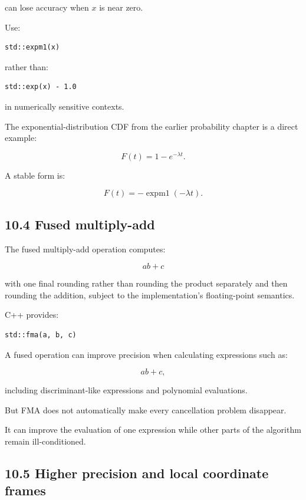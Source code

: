 can lose accuracy when \(x\) is near zero.

Use:

\begin{verbatim}
std::expm1(x)
\end{verbatim}

rather than:

\begin{verbatim}
std::exp(x) - 1.0
\end{verbatim}

in numerically sensitive contexts.

The exponential-distribution CDF from the earlier probability chapter is a direct example:

\[ F(t)=1-e^{-\lambda t}. \]

A stable form is:

\[ \boxed{ F(t)=-\operatorname{expm1}(-\lambda t) }. \]

\subsection{10.4 Fused multiply-add}\label{02-foundations-ii-ch028-fused-multiply-add}

The fused multiply-add operation computes:

\[ ab+c \]

with one final rounding rather than rounding the product separately and then rounding the addition, subject to the implementation's floating-point semantics.

C++ provides:

\begin{verbatim}
std::fma(a, b, c)
\end{verbatim}

A fused operation can improve precision when calculating expressions such as:

\[ ab+c, \]

including discriminant-like expressions and polynomial evaluations.

But FMA does not automatically make every cancellation problem disappear.

It can improve the evaluation of one expression while other parts of the algorithm remain ill-conditioned.

\subsection{10.5 Higher precision and local coordinate frames}\label{02-foundations-ii-ch028-higher-precision-and-local-coordinate-frames}

